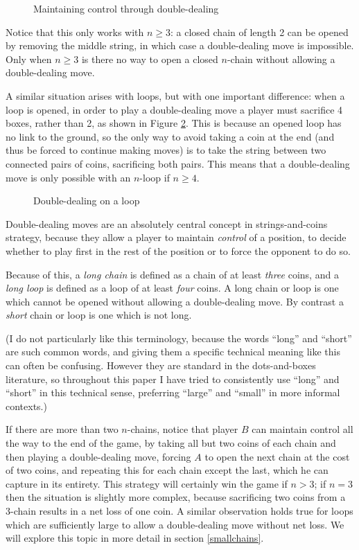 \documentclass[a4paper,twocolumn]{article}
\begin{document}
\begin{figure}
  \centering
  \def\svgscale{0.7}
  
  \caption{Maintaining control through double-dealing}
  \label{dddemo}
\end{figure}

Notice that this only works with $n \ge 3$: a closed chain of length 2
can be opened by removing the middle string, in which case a
double-dealing move is impossible. Only when $n \ge 3$ is there no way
to open a closed $n$-chain without allowing a double-dealing move.

A similar situation arises with loops, but with one important
difference: when a loop is opened, in order to play a double-dealing
move a player must sacrifice 4 boxes, rather than 2, as shown in
Figure \ref{loopdoubledeal}. This is because an opened loop has no
link to the ground, so the only way to avoid taking a coin at the end
(and thus be forced to continue making moves) is to take the string
between two connected pairs of coins, sacrificing both pairs. This
means that a double-dealing move is only possible with an $n$-loop if
$n \ge 4$.

\begin{figure}
  \centering
  \def\svgscale{0.7}
  
  \caption{Double-dealing on a loop}
  \label{loopdoubledeal}
\end{figure}

Double-dealing moves are an absolutely central concept in
strings-and-coins strategy, because they allow a player to maintain
\emph{control} of a position, to decide whether to play first in the
rest of the position or to force the opponent to do so.

Because of this, a \emph{long chain} is defined as a chain of at least
\emph{three} coins, and a \emph{long loop} is defined as a loop of at
least \emph{four} coins. A long chain or loop is one which cannot be
opened without allowing a double-dealing move. By contrast a
\emph{short} chain or loop is one which is not long.

(I do not particularly like this terminology, because the words
``long'' and ``short'' are such common words, and giving them a
specific technical meaning like this can often be confusing. However
they are standard in the dots-and-boxes literature, so throughout this
paper I have tried to consistently use ``long'' and ``short'' in this
technical sense, preferring ``large'' and ``small'' in more informal
contexts.)

If there are more than two $n$-chains, notice that player $B$ can
maintain control all the way to the end of the game, by taking all but
two coins of each chain and then playing a double-dealing move,
forcing $A$ to open the next chain at the cost of two coins, and
repeating this for each chain except the last, which he can capture in
its entirety. This strategy will certainly win the game if $n>3$; if
$n=3$ then the situation is slightly more complex, because sacrificing
two coins from a 3-chain results in a net loss of one coin. A similar
observation holds true for loops which are sufficiently large to allow
a double-dealing move without net loss. We will explore this topic in
more detail in section \ref{smallchains}.
\end{document}
